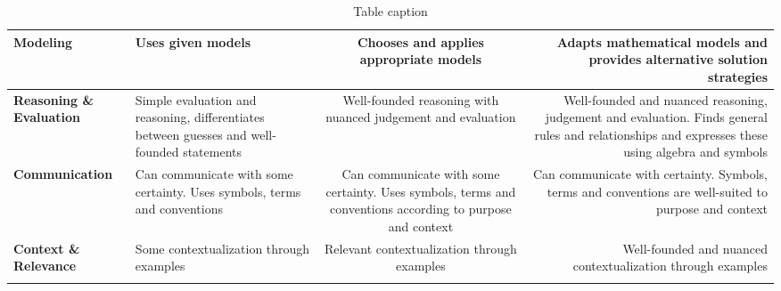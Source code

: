 \begin{landscape}
\begin{longtable}{ | A | B | C | D |}
\textbf{Modeling} &
Uses given models &
\alert{Chooses and applies} appropriate models&
\alert{Adapts} mathematical models and \alert{provides alternative} solution strategies
\\

\hline

\textbf{Reasoning \& Evaluation} &
\alert{Simple} evaluation and reasoning, differentiates between guesses and well-founded statements &
\alert{Well-founded} reasoning with \alert{nuanced} judgement and evaluation&
\alert{Well-founded} and \alert{nuanced} reasoning, judgement and evaluation. Finds \alert{general rules and relationships} and expresses these using \alert{algebra and symbols}
\\

\hline

\textbf{Communication} &
Can communicate with \alert{some} certainty. Uses symbols, terms and conventions &
Can communicate with \alert{some} certainty. Uses symbols, terms and conventions \alert{according to purpose and context}&
Can communicate with certainty. Symbols, terms and conventions are \alert{well-suited} to purpose and context
\\

\hline

\textbf{Context \& Relevance} &
\alert{Some} contextualization through examples &
\alert{Relevant} contextualization through examples &
\alert{Well-founded} and \alert{nuanced} contextualization through examples 
\\

\hline
\caption{Table caption}
\end{longtable}


\end{landscape}